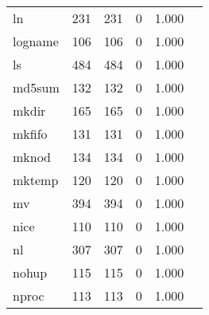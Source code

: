 \begin{longtable}{lp{2.4cm}p{2.4cm}p{2.4cm}p{2.4cm}p{2.4cm}}
ln        &                                    231 &                             231 &                                0 &                                       1.000 \\
logname   &                                    106 &                             106 &                                0 &                                       1.000 \\
ls        &                                    484 &                             484 &                                0 &                                       1.000 \\
md5sum    &                                    132 &                             132 &                                0 &                                       1.000 \\
mkdir     &                                    165 &                             165 &                                0 &                                       1.000 \\
mkfifo    &                                    131 &                             131 &                                0 &                                       1.000 \\
mknod     &                                    134 &                             134 &                                0 &                                       1.000 \\
mktemp    &                                    120 &                             120 &                                0 &                                       1.000 \\
mv        &                                    394 &                             394 &                                0 &                                       1.000 \\
nice      &                                    110 &                             110 &                                0 &                                       1.000 \\
nl        &                                    307 &                             307 &                                0 &                                       1.000 \\
nohup     &                                    115 &                             115 &                                0 &                                       1.000 \\
nproc     &                                    113 &                             113 &                                0 &                                       1.000 \\

\end{longtable}

